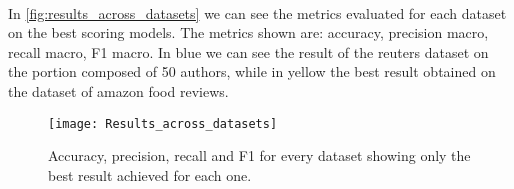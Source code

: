\paragraph{}
In \autoref{fig:results_across_datasets} we can see the metrics evaluated for each dataset on the best scoring models. The metrics shown are: accuracy, precision macro, recall macro, F1 macro.
In blue we can see the result of the reuters dataset on the portion composed of 50 authors, while in yellow the best result obtained on the dataset of amazon food reviews.
\begin{figure}[ht]
	\centering
	\texttt{[image: Results\_across\_datasets]}
	\caption[Best performance across all datasets]{Accuracy, precision, recall and F1 for every dataset showing only the best result achieved for each one.}
	\label{fig:results_across_datasets}
\end{figure}
